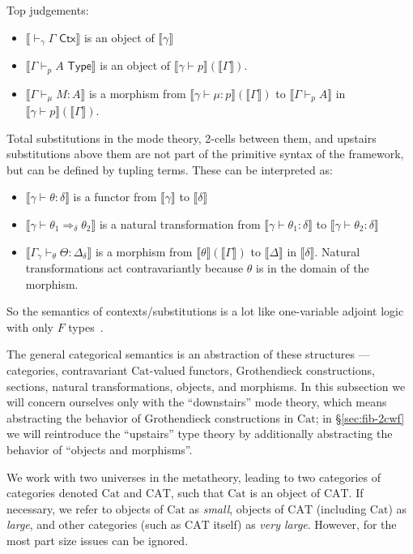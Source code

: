 \documentclass[10pt]{article}
\theoremstyle{definition}
\newcommand{\yields}{\vdash}
\newcommand{\tcell}{\Rightarrow}
\newcommand{\CTX}{\,\,\mathsf{Ctx}}
\newcommand{\TYPE}{\,\,\mathsf{Type}}
\newcommand\mm[1]{\llbracket #1 \rrbracket}
\newcommand\Cat{\mathrm{Cat}}
\newcommand\CAT{\mathrm{CAT}}
\begin{document}
Top judgements: 
\begin{itemize}
\item $\mm{\yields_\gamma \Gamma \CTX}$ is an object of $\mm{\gamma}$
\item $\mm{\Gamma \yields_p A \TYPE}$ is an object of $\mm{\gamma \yields p}(\mm{\Gamma})$.
\item $\mm{\Gamma \yields_\mu M : A}$ is a morphism from $\mm{\gamma \yields \mu : p}(\mm{\Gamma})$ to $\mm{\Gamma \yields_p A}$ in $\mm{\gamma \yields p}(\mm{\Gamma})$.
\end{itemize}

Total substitutions in the mode theory, 2-cells between them, and
upstairs substitutions above them are not part of the primitive syntax
of the framework, but can be defined by tupling terms.
These can be interpreted as: 
\begin{itemize}
\item $\mm{\gamma \yields \theta : \delta}$ is a functor from $\mm{\gamma}$ to $\mm{\delta}$
\item $\mm{\gamma \yields \theta_1 \tcell_\delta \theta_2}$ is a natural
  transformation from $\mm{\gamma \yields \theta_1 : \delta}$ to
  $\mm{\gamma \yields \theta_2 : \delta}$
\item $\mm{\Gamma_{\gamma} \yields_\theta \Theta : \Delta_\delta}$ is a
  morphism from $\mm{\theta}(\mm{\Gamma})$ to $\mm{\Delta}$ in
  $\mm{\delta}$.
  Natural transformations act contravariantly because $\theta$ is in the
  domain of the morphism.  
  \end{itemize}
So the semantics of contexts/substitutions is a lot like 
one-variable adjoint logic with only $F$ types~\cite{ls15adjoint}.  

The general categorical semantics is an abstraction of these structures --- categories, contravariant $\Cat$-valued functors, Grothendieck constructions, sections, natural transformations, objects, and morphisms.
In this subsection we will concern ourselves only with the ``downstairs'' mode theory, which means abstracting the behavior of Grothendieck constructions in $\Cat$; in \S\ref{sec:fib-2cwf} we will reintroduce the ``upstairs'' type theory by additionally abstracting the behavior of ``objects and morphisms''.

We work with two universes in the metatheory, leading to two categories of categories denoted $\Cat$ and $\CAT$, such that $\Cat$ is an object of $\CAT$.
If necessary, we refer to objects of $\Cat$ as \emph{small}, objects of $\CAT$ (including $\Cat$) as \emph{large}, and other categories (such as $\CAT$ itself) as \emph{very large}.
However, for the most part size issues can be ignored.
\end{document}
